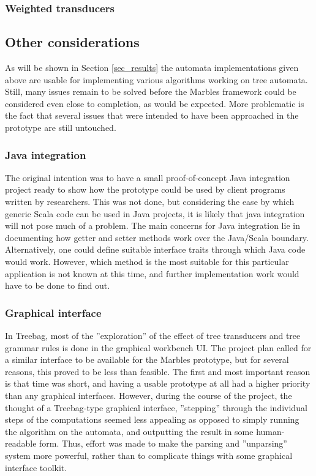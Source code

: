 \subsubsection{Weighted transducers}



\subsection{Other considerations}

As will be shown in Section \ref{sec_results} the automata implementations
given above are usable for implementing various algorithms working on tree
automata. Still, many issues remain to be solved before the Marbles
framework could be considered even close to completion, as would be
expected. More problematic is the fact that several issues that were
intended to have been approached in the prototype are still untouched.

\subsubsection{Java integration}

The original intention was to have a small proof-of-concept Java
integration project ready to show how the prototype could be used by client
programs written by researchers. This was not done, but considering the
ease by which generic Scala code can be used in Java projects, it is likely
that java integration will not pose much of a problem. The main concerns
for Java integration lie in documenting how getter and setter methods work
over the Java/Scala boundary. Alternatively, one could define suitable
interface traits through which Java code would work. However, which method
is the most suitable for this particular application is not known at this
time, and further implementation work would have to be done to find out.

\subsubsection{Graphical interface}

In Treebag, most of the ''exploration'' of the effect of tree transducers
and tree grammar rules is done in the graphical workbench UI. The project
plan called for a similar interface to be available for the Marbles
prototype, but for several reasons, this proved to be less than feasible.
The first and most important reason is that time was short, and having a
usable prototype at all had a higher priority than any graphical
interfaces. However, during the course of the project, the thought of a
Treebag-type graphical interface, ''stepping'' through the individual steps
of the computations seemed less appealing as opposed to simply running the
algorithm on the automata, and outputting the result in some human-readable
form. Thus, effort was made to make the parsing and ''unparsing'' system
more powerful, rather than to complicate things with some graphical
interface toolkit.

